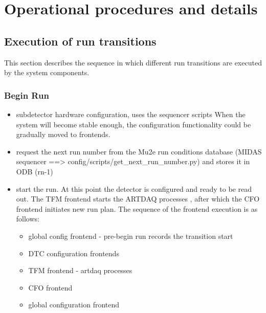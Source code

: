 \section{Operational procedures and details}

\subsection{Execution of run transitions}

This section describes the sequence in which different run transitions
are executed by the system components.


\subsubsection{Begin Run}
\begin{itemize}
\item
  subdetector hardware configuration, uses the sequencer scripts
  When the system will become stable enough, the configuration functionality
  could be gradually moved to frontends.
\item
  request the next run number from the Mu2e run conditions database
  (MIDAS sequencer ==> config/scripts/get\_next\_run\_number.py) and stores
  it in ODB (rn-1)
  
\item
  start the run. At this point the detector is configured and ready to be read out.
  The TFM frontend starts the ARTDAQ processes , after which the CFO frontend 
  initiates new run plan.
  The sequence of the frontend execution is as follows:
  \begin{itemize}
  \item
    global config frontend - pre-begin run records the transition start
  \item
    DTC configuration frontends 
  \item
    TFM frontend - artdaq processes
  \item
    CFO frontend 
  \item
    global configuration frontend
  \end{itemize}
\end{itemize}


